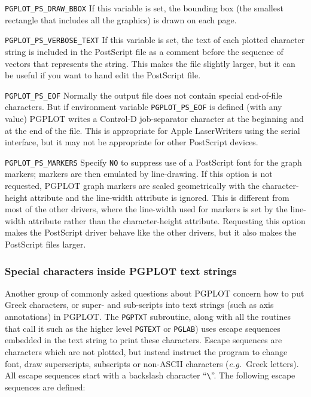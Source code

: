 \documentclass[twoside,11pt]{article}
\begin{document}
\begin{description}
\item{{\tt PGPLOT\_PS\_DRAW\_BBOX}}  If this variable is set, the bounding box (the smallest rectangle that includes all the graphics) is drawn on each page.
 
\item{{\tt PGPLOT\_PS\_VERBOSE\_TEXT}} If this variable is set, the text of each plotted character string is included in the PostScript file as a comment before the sequence of vectors that represents the string. This makes the file slightly larger, but it can be useful if you want to hand edit the PostScript file.
 
\item{{\tt PGPLOT\_PS\_EOF}}  Normally the output file does not contain special end-of-file characters. But if environment variable {\tt PGPLOT\_PS\_EOF} is defined (with any value) PGPLOT writes a Control-D job-separator character at the beginning and at the end of the file. This is appropriate for Apple LaserWriters using the serial interface, but it may not be appropriate for other PostScript devices.
 
\item{{\tt PGPLOT\_PS\_MARKERS}} Specify {\tt NO} to suppress use of a PostScript font for the graph markers; markers are then emulated by line-drawing. If this option is not requested, PGPLOT graph markers are scaled geometrically with the character-height attribute and the line-width attribute is ignored. This is different from most of the other drivers, where the line-width used for markers is set by the line-width attribute rather than the character-height attribute. Requesting this option makes the PostScript driver behave like the other drivers, but it also makes the PostScript files larger. 

\end{description}

\subsubsection{Special characters inside PGPLOT text strings}

Another group of commonly asked questions about PGPLOT concern how to put Greek characters, or super- and sub-scripts into text strings (such as axis annotations) in PGPLOT. The {\tt PGPTXT} subroutine, along with all the routines that call it such as the higher level {\tt PGTEXT} or {\tt PGLAB}) uses escape sequences embedded in the text string to print these characters. Escape sequences are characters which are not plotted, but instead instruct the program to change font, draw superscripts, subscripts or non-ASCII characters ({\em e.g.\ }Greek letters). All escape sequences start with a backslash character ``\verb*|\|''. The following escape sequences are defined:
\end{document}
